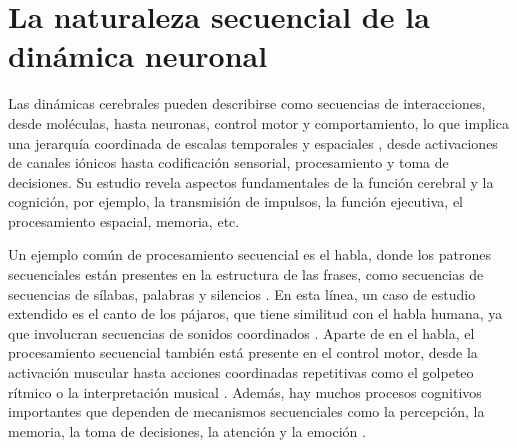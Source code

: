 \section{La naturaleza secuencial de la dinámica neuronal}

Las dinámicas cerebrales pueden describirse como secuencias de interacciones, desde moléculas, hasta neuronas, control motor y comportamiento, lo que implica una jerarquía coordinada de escalas temporales y espaciales \parencite{kiebel_hierarchy_2008,yuste_cortex_2005,rabinovich_discrete_2018,rabinovich_neurons_2023}, desde activaciones de canales iónicos hasta codificación sensorial, procesamiento y toma de decisiones. Su estudio revela aspectos fundamentales de la función cerebral y la cognición, por ejemplo, la transmisión de impulsos, la función ejecutiva, el procesamiento espacial, memoria, etc.

Un ejemplo común de procesamiento secuencial es el habla, donde los patrones secuenciales están presentes en la estructura de las frases, como secuencias de secuencias de sílabas, palabras y silencios \parencite{kiebel_recognizing_2009}. En esta línea, un caso de estudio extendido es el canto de los pájaros, que tiene similitud con el habla humana, ya que involucran secuencias de sonidos coordinados \parencite{prather_brains_2017,fishbein_sound_2019}. Aparte de en el habla, el procesamiento secuencial también está presente en el control motor, desde la activación muscular hasta acciones coordinadas repetitivas como el golpeteo rítmico o la interpretación musical \parencite{ding_temporal_2017}. Además, hay muchos procesos cognitivos importantes que dependen de mecanismos secuenciales como la percepción, la memoria, la toma de decisiones, la atención y la emoción \parencite{varona_hierarchical_2016, he_robust_2018, rabinovich_sequential_2020}.

